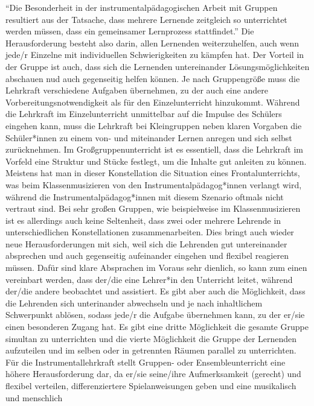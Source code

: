 \enquote{Die Besonderheit in der instrumentalpädagogischen Arbeit mit Gruppen
resultiert aus der Tatsache, dass mehrere Lernende zeitgleich so unterrichtet
werden müssen, dass ein gemeinsamer Lernprozess stattfindet.}
\autocite[221]{busch:grundwissen_instrumentalpaedagogik} Die Herausforderung
besteht also darin, allen Lernenden weiterzuhelfen, auch wenn jede/r Einzelne
mit individuellen Schwierigkeiten zu kämpfen hat. Der Vorteil in der Gruppe ist
auch, dass sich die Lernenden untereinander Lösungsmöglichkeiten abschauen nud
auch gegenseitig helfen können. Je nach Gruppengröße muss die Lehrkraft
verschiedene Aufgaben übernehmen, zu der auch eine andere
Vorbereitungsnotwendigkeit als für den Einzelunterricht hinzukommt. Während die
Lehrkraft im Einzelunterricht unmittelbar auf die Impulse des Schülers eingehen
kann, muss die Lehrkraft bei Kleingruppen neben klaren Vorgaben die
Schüler*innen zu einem von- und miteinander Lernen anregen und sich selbst
zurücknehmen. Im Großgruppenunterricht ist es essentiell, dass die Lehrkraft im
Vorfeld eine Struktur und Stücke festlegt, um die Inhalte gut anleiten zu
können.\autocite[220]{busch:grundwissen_instrumentalpaedagogik} Meistens hat man
in dieser Konstellation die Situation eines Frontalunterrichts, was beim
Klassenmusizieren von den Instrumentalpädagog*innen verlangt wird, während die
Instrumentalpädagog*innen mit diesem Szenario oftmals nicht vertraut sind. Bei
sehr großen Gruppen, wie beispielweise im Klassenmusizieren ist es allerdings
auch keine Seltenheit, dass zwei oder mehrere Lehrende in unterschiedlichen
Konstellationen zusammenarbeiten. Dies bringt auch wieder neue Herausforderungen
mit sich, weil sich die Lehrenden gut untereinander absprechen und auch
gegenseitig aufeinander eingehen und flexibel reagieren müssen. Dafür sind klare
Absprachen im Voraus sehr dienlich, so kann zum einen vereinbart werden, dass
der/die eine Lehrer*in den Unterricht leitet, während der/die andere beobachtet
und assistiert. Es gibt aber auch die Möglichkeit, dass die Lehrenden sich
unterinander abwechseln und je nach inhaltlichem Schwerpunkt ablösen, sodass
jede/r die Aufgabe übernehmen kann, zu der er/sie einen besonderen Zugang hat.
Es gibt eine dritte Möglichkeit die gesamte Gruppe simultan zu unterrichten und
die vierte Möglichkeit die Gruppe der Lernenden aufzuteilen und im selben oder
in getrennten Räumen parallel zu unterrichten. Für die Instrumentallehrkraft
stellt Gruppen- oder Ensembleunterricht eine höhere Herausforderung dar, da
er/sie seine/ihre Aufmerksamkeit (gerecht) und flexibel verteilen,
differenziertere Spielanweisungen geben und eine musikalisch und menschlich
